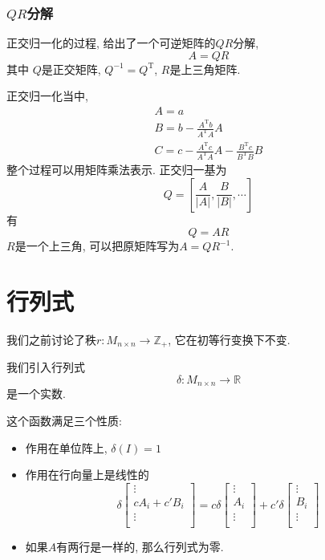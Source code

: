 \subsubsection{$QR$分解}
正交归一化的过程, 给出了一个可逆矩阵的$QR$分解,
\begin{equation}
  A = QR
\end{equation}
其中 $Q$是正交矩阵, $Q^{-1} = Q^{\mathrm{T}}$, $R$是上三角矩阵.

正交归一化当中,
\begin{gather}
    A = a
    \\
    B = b - \frac{A^{\mathrm{T}}b}{A^{\mathrm{T}}A}A
    \\
    C = c - \frac{A^{\mathrm{T}}c}{A^{\mathrm{T}}A}A - \frac{B^{\mathrm{T}}c}{B^{\mathrm{T}}B}B
\end{gather}
整个过程可以用矩阵乘法表示. 正交归一基为
\begin{equation}
  Q = \left[ \frac{A}{|A|} , \frac{B}{|B|}, \cdots   \right] 
\end{equation}
有
\begin{equation}
  Q = AR
\end{equation}
$R$是一个上三角, 可以把原矩阵写为$A = Q R^{-1}$.

\section{行列式}
我们之前讨论了秩$r\colon M_{n \times n} \to \mathbb{Z}_{+}$, 它在初等行变换下不变.

我们引入行列式
\begin{equation}
  \delta\colon M_{n \times n} \to \mathbb{R}
\end{equation}
是一个实数.

这个函数满足三个性质:
\begin{itemize}
    \item 作用在单位阵上, $\delta(I) = 1$
    \item 作用在行向量上是线性的
    \begin{equation}
      \delta \begin{bmatrix}
       \vdots\\
       c A_i + c' B_i\\
       \vdots\\
      \end{bmatrix}
      =
      c \delta 
      \begin{bmatrix}
       \vdots\\
       A_i\\
       \vdots\\
      \end{bmatrix}
      +
      c'\delta
      \begin{bmatrix}
       \vdots\\
       B_i\\
       \vdots\\
      \end{bmatrix}
    \end{equation}

    \item 如果$A$有两行是一样的, 那么行列式为零.
\end{itemize}


